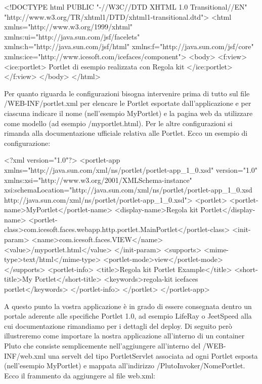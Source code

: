 \begin{xml}
<!DOCTYPE html PUBLIC "-//W3C//DTD XHTML 1.0 Transitional//EN" "http://www.w3.org/TR/xhtml1/DTD/xhtml1-transitional.dtd">
<html xmlns="http://www.w3.org/1999/xhtml"
  xmlns:ui="http://java.sun.com/jsf/facelets"
  xmlns:h="http://java.sun.com/jsf/html"
  xmlns:f="http://java.sun.com/jsf/core"
  xmlns:ice="http://www.icesoft.com/icefaces/component">
<body>
  <f:view>
     <ice:portlet>
        Portlet di esempio realizzata con Regola kit
     </ice:portlet>
  </f:view>
</body>
</html>
\end{xml}

Per quanto riguarda le configurazioni bisogna intervenire prima di tutto sul file /WEB-INF/portlet.xml per elencare le Portlet esportate dall'applicazione e per ciascuna indicare il nome (nell'esempio MyPortlet) e la pagina web da utilizzare come modello (ad esempio /myportlet.html). Per le altre configurazioni si rimanda alla documentazione ufficiale relativa alle Portlet. Ecco un esempio di configurazione:

\begin{xml}
<?xml version="1.0"?>
<portlet-app xmlns="http://java.sun.com/xml/ns/portlet/portlet-app_1_0.xsd" version="1.0" xmlns:xsi="http://www.w3.org/2001/XMLSchema-instance" xsi:schemaLocation="http://java.sun.com/xml/ns/portlet/portlet-app_1_0.xsd http://java.sun.com/xml/ns/portlet/portlet-app_1_0.xsd">
    <portlet>
        <portlet-name>MyPortlet</portlet-name>
        <display-name>Regola kit Portlet</display-name>
        <portlet-class>com.icesoft.faces.webapp.http.portlet.MainPortlet</portlet-class>
        <init-param>
            <name>com.icesoft.faces.VIEW</name>
            <value>/myportlet.html</value>
        </init-param>
        <supports>
            <mime-type>text/html</mime-type>
            <portlet-mode>view</portlet-mode>
        </supports>
        <portlet-info>
            <title>Regola kit Portlet Example</title>
            <short-title>My Portlet</short-title>
            <keywords>regola-kit icefaces portlet</keywords>
        </portlet-info>
    </portlet>
</portlet-app>
  
\end{xml}


A questo punto la vostra applicazione è in grado di essere consegnata dentro un portale aderente alle specifiche Portlet 1.0, ad esempio LifeRay o JeetSpeed alla cui documentazione rimandiamo per i dettagli del deploy. Di seguito però illustreremo come importare la nostra applicazione all'interno di un container Pluto che consiste semplicemente nell'aggiungere all'interno del /WEB-INF/web.xml una servelt del tipo PortletServlet associata ad ogni Portlet esposta (nell'esempio MyPortlet)  e mappata all'indirizzo  /PlutoInvoker/NomePortlet. Ecco il frammento da aggiungere al file web.xml:

